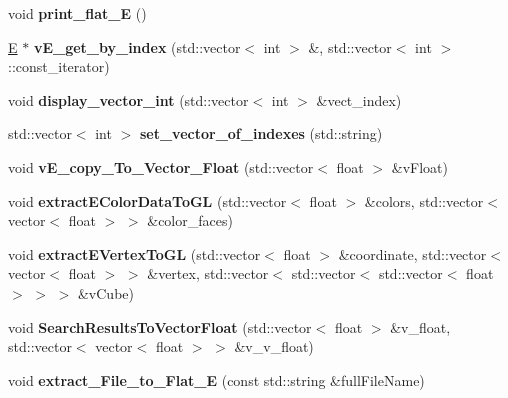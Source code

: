 \begin{DoxyCompactItemize}
\item 
void {\bfseries print\+\_\+flat\+\_\+E} ()\hypertarget{classE_a9f42ad7effbd9d38aa683f0798bc86f5}{}\label{classE_a9f42ad7effbd9d38aa683f0798bc86f5}

\item 
\hyperlink{classE}{E} $\ast$ {\bfseries v\+E\+\_\+get\+\_\+by\+\_\+index} (std\+::vector$<$ int $>$ \&, std\+::vector$<$ int $>$\+::const\+\_\+iterator)\hypertarget{classE_ae410935c92a52a20c9b5964876509bd3}{}\label{classE_ae410935c92a52a20c9b5964876509bd3}

\item 
void {\bfseries display\+\_\+vector\+\_\+int} (std\+::vector$<$ int $>$ \&vect\+\_\+index)\hypertarget{classE_a775c141cef4f790b906881e26f6b452c}{}\label{classE_a775c141cef4f790b906881e26f6b452c}

\item 
std\+::vector$<$ int $>$ {\bfseries set\+\_\+vector\+\_\+of\+\_\+indexes} (std\+::string)\hypertarget{classE_afb2ef45ac8da3d297bd4aa4f140e5ac1}{}\label{classE_afb2ef45ac8da3d297bd4aa4f140e5ac1}

\item 
void {\bfseries v\+E\+\_\+copy\+\_\+\+To\+\_\+\+Vector\+\_\+\+Float} (std\+::vector$<$ float $>$ \&v\+Float)\hypertarget{classE_ae8976ee0b6f4d06405251f742667934b}{}\label{classE_ae8976ee0b6f4d06405251f742667934b}

\item 
void {\bfseries extract\+E\+Color\+Data\+To\+GL} (std\+::vector$<$ float $>$ \&colors, std\+::vector$<$ vector$<$ float $>$ $>$ \&color\+\_\+faces)\hypertarget{classE_a9e532cc702bb74774222e2701c2a296f}{}\label{classE_a9e532cc702bb74774222e2701c2a296f}

\item 
void {\bfseries extract\+E\+Vertex\+To\+GL} (std\+::vector$<$ float $>$ \&coordinate, std\+::vector$<$ vector$<$ float $>$ $>$ \&vertex, std\+::vector$<$ std\+::vector$<$ std\+::vector$<$ float $>$ $>$ $>$ \&v\+Cube)\hypertarget{classE_ab518f62833c4aa89e5ce660a1df0bdf7}{}\label{classE_ab518f62833c4aa89e5ce660a1df0bdf7}

\item 
void {\bfseries Search\+Results\+To\+Vector\+Float} (std\+::vector$<$ float $>$ \&v\+\_\+float, std\+::vector$<$ vector$<$ float $>$ $>$ \&v\+\_\+v\+\_\+float)\hypertarget{classE_a1b95d60a5fe8b773d3da191033f25b94}{}\label{classE_a1b95d60a5fe8b773d3da191033f25b94}

\item 
void {\bfseries extract\+\_\+\+File\+\_\+to\+\_\+\+Flat\+\_\+E} (const std\+::string \&full\+File\+Name)\hypertarget{classE_a558edfca25291d292dfbfc3c0e1c1f27}{}\label{classE_a558edfca25291d292dfbfc3c0e1c1f27}


\end{DoxyCompactItemize}
